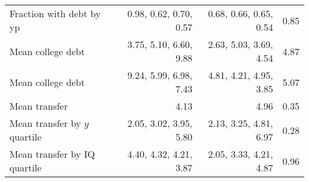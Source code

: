 \begin{tabular}{lrrr}
Fraction with debt by yp & 0.98, 0.62, 0.70, 0.57  & 0.68, 0.66, 0.65, 0.54  & 0.85  \\ 
Mean college debt & 3.75, 5.10, 6.60, 9.88  & 2.63, 5.03, 3.69, 4.54  & 4.87  \\ 
Mean college debt & 9.24, 5.99, 6.98, 7.43  & 4.81, 4.21, 4.95, 3.85  & 5.07  \\ 
Mean transfer & 4.13  & 4.96  & 0.35  \\ 
Mean transfer by $y$ quartile & 2.05, 3.02, 3.95, 5.80  & 2.13, 3.25, 4.81, 6.97  & 0.28  \\ 
Mean transfer by IQ quartile & 4.40, 4.32, 4.21, 3.87  & 2.05, 3.33, 4.21, 4.87  & 0.96  \\ 
\hline
\end{tabular}%
